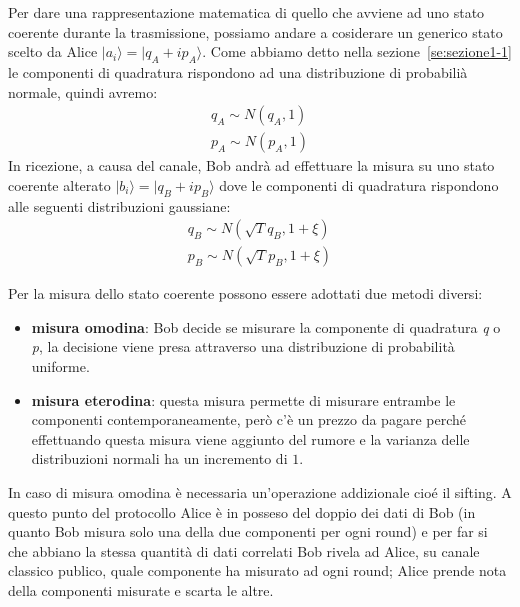 Per dare una rappresentazione matematica di quello che avviene ad uno stato coerente durante la trasmissione, possiamo andare a cosiderare un generico stato scelto da Alice $|a_i \rangle = | q_A + i p_A\rangle$. Come abbiamo detto nella sezione~\ref{se:sezione1-1} le componenti di quadratura rispondono ad una distribuzione di probabili\`a normale, quindi avremo:
\begin{equation}
\begin{split}
q_A \sim N(q_A, 1) \\
p_A \sim N(p_A, 1)
\end{split}
\end{equation}
In ricezione, a causa del canale, Bob andr\`a ad effettuare la misura su uno stato coerente alterato $|b_i \rangle = | q_B + i p_B\rangle$ dove le componenti di quadratura rispondono alle seguenti distribuzioni gaussiane:
\begin{equation}
\begin{split}
q_B \sim N(\sqrt{T} q_B, 1 + \xi) \\
p_B \sim N(\sqrt{T} p_B, 1 + \xi)
\end{split}
\end{equation}

Per la misura dello stato coerente possono essere adottati due metodi diversi:
\begin{itemize}
\item \textbf{misura omodina}: Bob decide se misurare la componente di quadratura \textit{q} o \textit{p}, la decisione viene presa attraverso una distribuzione di probabilit\`a uniforme.
\item \textbf{misura eterodina}: questa misura permette di misurare entrambe le componenti contemporaneamente, per\`o c'\`e un prezzo da pagare perch\'e effettuando questa misura viene aggiunto del rumore e la varianza delle distribuzioni normali ha un incremento di $1$.
\end{itemize}  

In caso di misura omodina \`e necessaria un'operazione addizionale cio\'e il sifting. A questo punto del protocollo Alice \`e in posseso del doppio dei dati di Bob (in quanto Bob misura solo una della due componenti per ogni round) e per far si che abbiano la stessa quantit\`a di dati correlati Bob rivela ad Alice, su canale classico publico, quale componente ha misurato ad ogni round; Alice prende nota della componenti misurate e scarta le altre.\cite{milicevic_key_2018}

